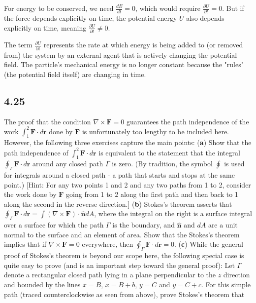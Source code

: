 \documentclass[11pt, a4paper]{article} %
\begin{document}
For energy to be conserved, we need $\frac{dE}{dt} = 0$, which would require $\frac{\partial U}{\partial t} = 0$. But if the force depends explicitly on time, the potential energy $U$ also depends explicitly on time, meaning $\frac{\partial U}{\partial t} \neq 0$.

The term $\frac{\partial U}{\partial t}$ represents the rate at which energy is being added to (or removed from) the system by an external agent that is actively changing the potential field. The particle's mechanical energy is no longer constant because the "rules" (the potential field itself) are changing in time.

\newpage
\subsection*{4.25}

The proof that the condition $\nabla \times \mathbf{F} = 0$ guarantees the path independence of the work $\int_1^2 \mathbf{F} \cdot d \mathbf{r}$ done by $\mathbf{F}$ is unfortunately too lengthy to be included here. However, the following three exercises capture the main points: (\textbf{a}) Show that the path independence of $\int_1^2 \mathbf{F} \cdot d \mathbf{r}$ is equivalent to the statement that the integral $\oint_\Gamma \mathbf{F}\cdot d \mathbf{r}$ around any closed path $\Gamma$ is zero. (By tradition, the symbol $\oint$ is used for integrals around a closed path - a path that starts and stops at the same point.) [Hint: For any two points 1 and 2 and any two paths from 1 to 2, consider the work done by $\mathbf{F}$ going from 1 to 2 along the first path and then back to 1 along the second in the reverse direction.] (\textbf{b}) Stokes's theorem asserts that $\oint_\Gamma \mathbf{F}\cdot d \mathbf{r} = \int (\nabla \times \mathbf{F}) \cdot \hat{\mathbf{n}} dA$, where the integral on the right is a surface integral over a surface for which the path $\Gamma$ is the boundary, and $\hat{\mathbf{n}}$ and $dA$ are a unit normal to the surface and an element of area. Show that the Stokes's theorem implies that if $\nabla \times \mathbf{F} = 0$ everywhere, then $\oint_\Gamma \mathbf{F} \cdot d\mathbf{r} = 0$. (\textbf{c}) While the general proof of Stokes's theorem is beyond our scope here, the following special case is quite easy to prove (and is an important step toward the general proof): Let $\Gamma$ denote a rectangular closed path lying in a plane perpendicular to the $z$ direction and bounded by the lines $x = B$, $x= B+b$, $y=C$ and $y=C+c$. For this simple path (traced counterclockwise as seen from above), prove Stokes's theorem that
\end{document}
